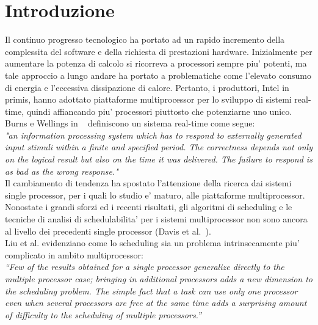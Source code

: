 

\section{Introduzione}
\label{sec:introduzione}

Il continuo progresso tecnologico ha portato ad un rapido incremento della complessita del software e della richiesta di prestazioni hardware. Inizialmente per aumentare la potenza di calcolo si ricorreva a processori sempre piu' potenti, ma tale approccio a lungo andare ha portato a problematiche come l'elevato consumo di energia e l'eccessiva dissipazione di calore. Pertanto, i produttori, Intel in primis, hanno adottato piattaforme multiprocessor per lo sviluppo di sistemi real-time, quindi affiancando piu' processori piuttosto che potenziarne uno unico.\\

Burns e Wellings in ~\cite{Burns:2009:RSP:1643588} definiscono un sistema real-time come segue:\\

\textit{"an information processing system which has to respond to externally generated input stimuli within a finite and specified period. The correctness depends not only on the logical result but also on the time it was delivered. The failure to respond is as bad as the wrong response."}\\

Il cambiamento di tendenza ha spostato l'attenzione della ricerca dai sistemi single processor, per i quali lo studio e' maturo, alle piattaforme multiprocessor. Nonostate i grandi sforzi ed i recenti risultati, gli algoritmi di scheduling e le tecniche di analisi di schedulabilita' per i sistemi multiprocessor non sono ancora al livello dei precedenti single processor (Davis et al.~\cite{Davis:2011:SHR:1978802.1978814}).\\

Liu et al.\cite{Liu:1973:SAM:321738.321743} evidenziano come lo scheduling sia un problema intrinsecamente piu' complicato in ambito multiprocessor:\\

\textit{“Few of the results obtained for a single processor generalize directly to the multiple processor case; bringing in additional processors adds a new dimension to the scheduling problem. The simple fact that a task can use only one processor even when several processors are free at the same time adds a surprising amount of difficulty to the scheduling of multiple processors.”}\\

